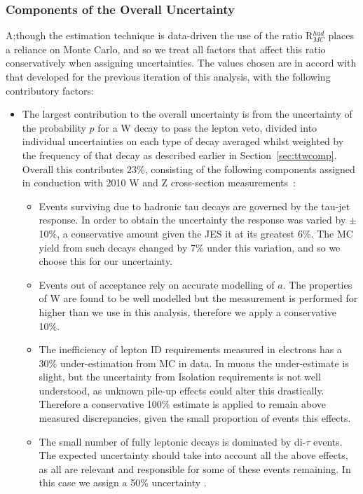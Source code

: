 \subsubsection{Components of the Overall Uncertainty}
A;though the estimation technique is data-driven the use of the ratio R$^{had}_{MC}$ places a reliance on Monte Carlo, and so we treat all factors that affect this ratio conservatively when assigning uncertainties. The values chosen are in accord with that developed for the previous iteration of this analysis, with the following contributory factors:
\begin{itemize}
\item The largest contribution to the overall uncertainty is from the uncertainty of the probability $p$ for a W decay to pass the lepton veto, divided into individual uncertainties on each type of decay averaged whilst weighted by the frequency of that decay as described earlier in Section~\ref{sec:ttwcomp}. Overall this contributes 23\%, consisting of the following components assigned in conduction with 2010 W and Z cross-section measurements~\cite{WZXS}:
\begin{itemize}
\item Events surviving due to hadronic tau decays are governed by the tau-jet response. In order to obtain the uncertainty the response was varied by $\pm$ 10\%, a conservative amount given the JES it at its greatest 6\%. The MC yield from such decays changed by 7\% under this variation, and so we choose this for our uncertainty. 
\item Events out of acceptance rely on accurate modelling of $a$. The properties of W are found to be well modelled but the measurement is performed for higher \Pt than we use in this analysis, therefore we apply a conservative 10\%. 
\item The inefficiency of lepton ID requirements measured in electrons has a 30\% under-estimation from MC in data. In muons the under-estimate is slight, but the uncertainty from Isolation requirements is not well understood, as unknown pile-up effects could alter this drastically. Therefore a conservative 100\% estimate is applied to remain above measured discrepancies, given the small proportion of events this effects. 
\item The small number of fully leptonic \tto decays is dominated by di-$\tau$ events. The expected uncertainty should take into account all the above effects, as all are relevant and responsible for some of these events remaining. In this case we assign a 50\% uncertainty .

\end{itemize}
\end{itemize}
